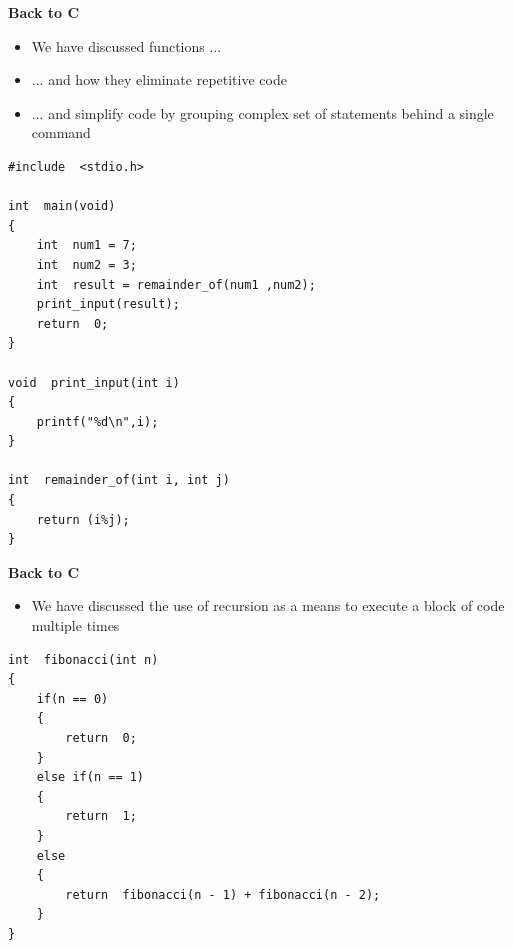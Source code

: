 \documentclass{beamer}
\begin{document}

\begin{frame} 
\begin{center}
\textbf{Back to C}
\end{center}
\begin{itemize}
\item We have discussed functions ...
\item ... and how they eliminate repetitive code
\item ... and simplify code by grouping complex set of statements behind a single command
\end{itemize}
\end{frame}

\begin{frame}[fragile]
\begin{block}{}
\begin{lstlisting}
#include  <stdio.h>

int  main(void)
{
    int  num1 = 7;
    int  num2 = 3;
    int  result = remainder_of(num1 ,num2);
    print_input(result);
    return  0;
}

void  print_input(int i)
{
    printf("%d\n",i);
}

int  remainder_of(int i, int j)
{
    return (i%j);
}
\end{lstlisting}
\end{block}
\end{frame}

\begin{frame} 
\begin{center}
\textbf{Back to C}
\end{center}
\begin{itemize}
\item We have discussed the use of recursion as a means to execute a block of code multiple times
\end{itemize}
\end{frame}

\begin{frame}[fragile]
\begin{block}{}
\begin{lstlisting}
int  fibonacci(int n)
{
    if(n == 0)
    {
        return  0;
    }
    else if(n == 1)
    {
        return  1;
    }
    else
    {
        return  fibonacci(n - 1) + fibonacci(n - 2);
    }
}
\end{lstlisting}
\end{block}
\end{frame}
\end{document}
